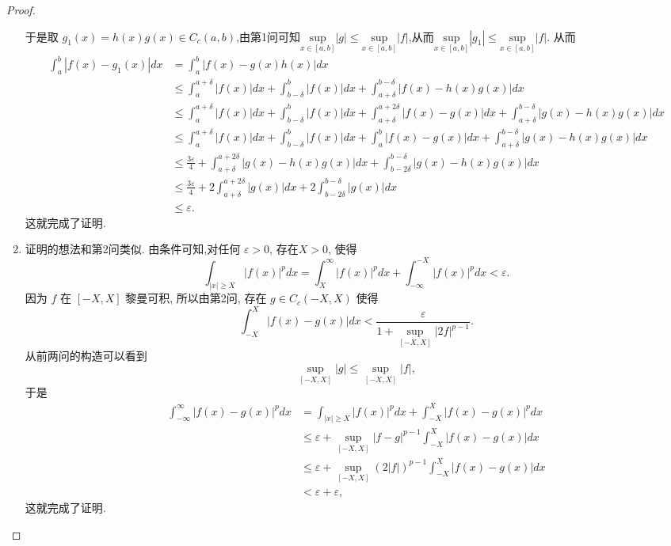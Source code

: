 \documentclass[../../main.tex]{subfiles}
\begin{document}
\begin{proof}
\begin{enumerate}[(1)]
于是取 $g_1(x) = h(x)g(x) \in C_c(a,b)$,由第1问可知$\underset{x\in \left[ a,b \right]}{\mathrm{sup}}\left| g \right|\leqslant \underset{x\in \left[ a,b \right]}{\mathrm{sup}}\left| f \right|$,从而$\underset{x\in \left[ a,b \right]}{\mathrm{sup}}\left| g_1 \right|\leqslant \underset{x\in \left[ a,b \right]}{\mathrm{sup}}\left| f \right|$.
从而
\begin{align*}
\int_{a}^{b} |f(x) - g_1(x)|dx &= \int_{a}^{b} |f(x) - g(x)h(x)|dx \\
&\leqslant \int_{a}^{a + \delta} |f(x)|dx + \int_{b - \delta}^{b} |f(x)|dx + \int_{a + \delta}^{b - \delta} |f(x) - h(x)g(x)|dx \\
&\leqslant \int_{a}^{a + \delta} |f(x)|dx + \int_{b - \delta}^{b} |f(x)|dx + \int_{a + \delta}^{a + 2\delta} |f(x) - g(x)|dx + \int_{a + \delta}^{b - \delta} |g(x) - h(x)g(x)|dx \\
&\leqslant \int_{a}^{a + \delta} |f(x)|dx + \int_{b - \delta}^{b} |f(x)|dx + \int_{a}^{b} |f(x) - g(x)|dx + \int_{a + \delta}^{b - \delta} |g(x) - h(x)g(x)|dx \\
&\leqslant \frac{3\varepsilon}{4} + \int_{a + \delta}^{a + 2\delta} |g(x) - h(x)g(x)|dx + \int_{b - 2\delta}^{b - \delta} |g(x) - h(x)g(x)|dx \\
&\leqslant \frac{3\varepsilon}{4} + 2 \int_{a + \delta}^{a + 2\delta} |g(x)|dx + 2 \int_{b - 2\delta}^{b - \delta} |g(x)|dx \\
&\leqslant \varepsilon.
\end{align*}
这就完成了证明.

\item 证明的想法和第2问类似. 由条件可知,对任何 $\varepsilon > 0$, 存在$X > 0$, 使得
\[
\int_{|x| \geqslant X} |f(x)|^{p}dx=
\int_{X}^{\infty} |f(x)|^{p}dx + \int_{-\infty}^{-X} |f(x)|^{p}dx < \varepsilon.
\]
因为 $f$ 在 $[-X,X]$ 黎曼可积, 所以由第2问, 存在 $g \in C_c(-X,X)$ 使得
\[
\int_{-X}^{X} |f(x) - g(x)|dx < \frac{\varepsilon}{1 + \sup_{[-X,X]} |2f|^{p - 1}}.
\]
从前两问的构造可以看到
\[
\sup_{[-X,X]} |g| \leqslant \sup_{[-X,X]} |f|,
\]
于是
\begin{align*}
\int_{-\infty}^{\infty} |f(x) - g(x)|^{p}dx &= \int_{|x| \geqslant X} |f(x)|^{p}dx + \int_{-X}^{X} |f(x) - g(x)|^{p}dx \\
&\leqslant \varepsilon + \sup_{[-X,X]} |f - g|^{p - 1} \int_{-X}^{X} |f(x) - g(x)|dx \\
&\leqslant \varepsilon + \sup_{[-X,X]} (2|f|)^{p - 1} \int_{-X}^{X} |f(x) - g(x)|dx \\
&< \varepsilon + \varepsilon,
\end{align*}
这就完成了证明. 
\end{enumerate}
\end{proof}
\end{document}
